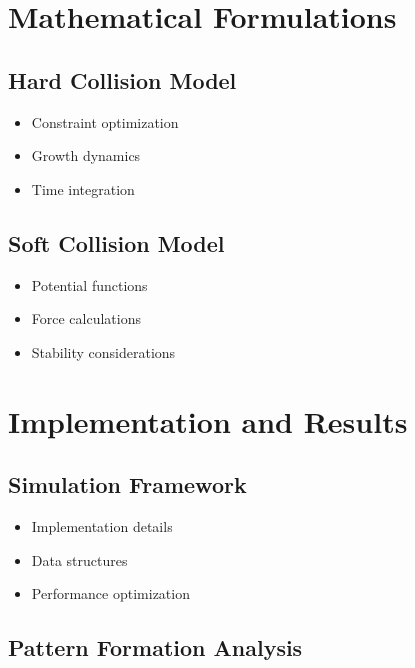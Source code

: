 \documentclass[conference]{IEEEtran}
\begin{document}
\section{Mathematical Formulations}
\subsection{Hard Collision Model}
\begin{itemize}
    \item Constraint optimization
    \item Growth dynamics
    \item Time integration
\end{itemize}

\subsection{Soft Collision Model}
\begin{itemize}
    \item Potential functions
    \item Force calculations
    \item Stability considerations
\end{itemize}

\section{Implementation and Results}
\subsection{Simulation Framework}
\begin{itemize}
    \item Implementation details
    \item Data structures
    \item Performance optimization
\end{itemize}

\subsection{Pattern Formation Analysis}
\end{document}
